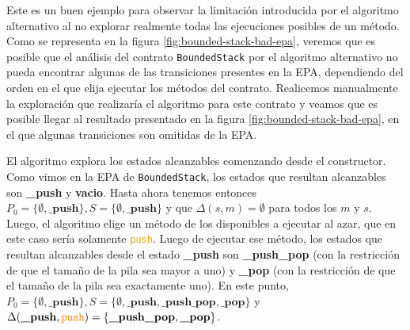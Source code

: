 Este es un buen ejemplo para observar la limitación introducida por el algoritmo alternativo al no explorar realmente todas las ejecuciones posibles de un método.
Como se representa en la figura \ref{fig:bounded-stack-bad-epa}, veremos que es posible que el análisis del contrato \texttt{BoundedStack} por el algoritmo alternativo no pueda encontrar algunas de las transiciones presentes en la EPA, dependiendo del orden en el que elija ejecutar los métodos del contrato.
Realicemos manualmente la exploración que realizaría el algoritmo para este contrato y veamos que es posible llegar al resultado presentado en la figura \ref{fig:bounded-stack-bad-epa}, en el que algunas transiciones son omitidas de la EPA.

El algoritmo explora los estados alcanzables comenzando desde el constructor.
Como vimos en la EPA de \texttt{BoundedStack}, los estados que resultan alcanzables son \textbf{\_push} y \textbf{vacio}.
Hasta ahora tenemos entonces $P_0 = \{\emptyset, \textbf{\_push}\}, S = \{\emptyset, \textbf{\_push}\}$ y que  $\Delta(s,m) = \emptyset$ para todos los $m$ y $s$.
Luego, el algoritmo elige un método de los disponibles a ejecutar al azar, que en este caso sería solamente \textcolor{orange}{\texttt{push}}.
Luego de ejecutar ese método, los estados que resultan alcanzables desde el estado \textbf{\_push} son \textbf{\_push\_pop} (con la restricción de que el tamaño de la pila sea mayor a uno) y \textbf{\_pop} (con la restricción de que el tamaño de la pila sea exactamente uno).
En este punto, $P_0 = \{\emptyset, \textbf{\_push}\}, S = \{\emptyset, \textbf{\_push}, \textbf{\_push\_pop}, \textbf{\_pop}\}$ y  $\Delta(\textbf{\_push},\textcolor{orange}{\texttt{push}}) = \{\textbf{\_push\_pop}, \textbf{\_pop}\}$.

